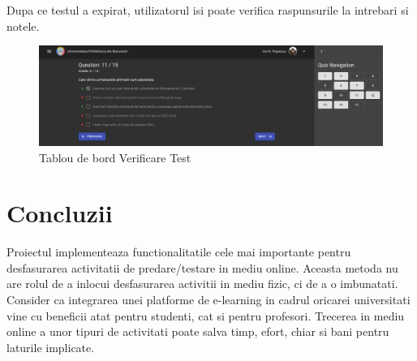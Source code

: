 \documentclass[12pt, a4paper, oneside, romanian]{teza-upb}
\begin{document}
Dupa ce testul a expirat, utilizatorul isi poate verifica raspunsurile la intrebari si notele.

\begin{figure}[H]
\centering
\includegraphics*[width=\columnwidth]{tablou-de-bord-verificare-test}
\caption{Tablou de bord Verificare Test}
\label{tablou-de-bord-verificare-test}
\end{figure}




\chapter*{Concluzii}

Proiectul implementeaza functionalitatile cele mai importante pentru desfasurarea activitatii de predare/testare in mediu online. Aceasta metoda nu are rolul de a inlocui desfasurarea activitii in mediu fizic, ci de a o imbunatati. Consider ca integrarea unei platforme de e-learning in cadrul oricarei universitati vine cu beneficii atat pentru studenti, cat si pentru profesori. Trecerea in mediu online a unor tipuri de activitati poate salva timp, efort, chiar si bani pentru laturile implicate.





\end{document}

